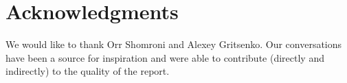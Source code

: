 \documentclass{acm_proc_article-sp}
\begin{document}


%

\section{Acknowledgments}
We would like to thank Orr Shomroni and Alexey Gritsenko. Our conversations have been a source for inspiration
and were able to contribute (directly and indirectly) to the quality of the report.



\end{document}
